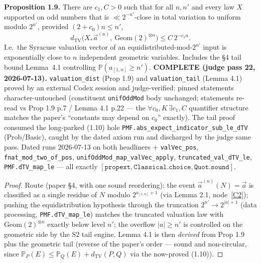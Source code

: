 \begin{proposition}\label{C5}
  \leanok
\textbf{Proposition 1.9.}  There are \(c_1,C>0\) such that for all \(n,n'\) and every law
\(X\) supported on odd numbers that is \(\ll 2^{-n'}\)-close in total variation to uniform
modulo \(2^{n'}\), provided \((2+c_0)n\le n'\),
\[
  d_{\mathrm{TV}}\!\bigl(X_*\vec a^{(n)},\ \mathrm{Geom}(2)^{\otimes n}\bigr)
    \le C\,2^{-c_1 n}.
\]
I.e.\ the Syracuse valuation vector of an equidistributed-mod-\(2^{n'}\) input is
exponentially close to \(n\) independent geometric variables.  Includes the §4 tail bound
Lemma~4.1 controlling \(\mathbb{P}(a_{[1,n]}\ge n')\).
\textbf{COMPLETE (judge pass 22, 2026-07-13).}  \texttt{valuation\_dist} (Prop 1.9) and
\texttt{valuation\_tail} (Lemma 4.1) proved by an external Codex session and
judge-verified: pinned statements character-untouched (constituent
\texttt{unifOddMod} body unchanged; statements re-read vs Prop 1.9 p.7 / Lemma 4.1
p.22 --- the \(\forall c_0,K\,\exists c_1,C\) quantifier structure matches the paper's
``constants may depend on \(c_0\)'' exactly).  The tail proof consumed the
long-parked (1.10) hole \texttt{PMF.abs\_expect\_indicator\_sub\_le\_dTV}
(Prob/Basic), caught by the dated axiom run and discharged by the judge same pass.
Dated runs 2026-07-13 on both headliners + \texttt{valVec\_pos},
\texttt{fnat\_mod\_two\_of\_pos}, \texttt{unifOddMod\_map\_valVec\_apply},
\texttt{truncated\_val\_dTV\_le}, \texttt{PMF.dTV\_map\_le} --- all exactly
\([\texttt{propext}, \texttt{Classical.choice}, \texttt{Quot.sound}]\).
\end{proposition}
\begin{proof}
  \leanok
  Route (paper §4, with one sound reordering): the event
  \(\vec a^{(n)}(N) = \vec a\) is classified as a single residue of \(N\) modulo
  \(2^{a_{[1,n]}+1}\) (via Lemma 2.1, node~\ref{C2}); pushing the
  equidistribution hypothesis through the truncation \(2^{n'} \to 2^{|a|+1}\)
  (data processing, \texttt{PMF.dTV\_map\_le}) matches the truncated valuation
  law with \(\mathrm{Geom}(2)^{\otimes n}\) exactly below level \(n'\); the
  overflow \(|a| \ge n'\) is controlled on the geometric side by the S2 tail
  engine.  Lemma 4.1 is then \emph{derived} from Prop 1.9 plus the geometric
  tail (reverse of the paper's order --- sound and non-circular, since
  \(\mathbb{P}_P(E) \le \mathbb{P}_Q(E) + d_{\mathrm{TV}}(P,Q)\) via the
  now-proved (1.10)).
\end{proof}


